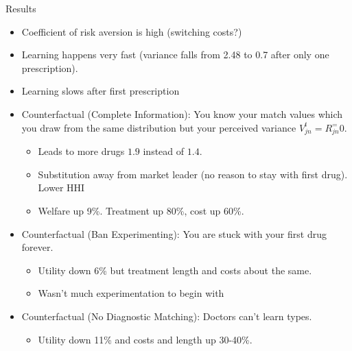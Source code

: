 \documentclass[xcolor=pdftex,dvipsnames,table,mathserif]{beamer}
\begin{document}
\begin{frame}{Results}
\begin{itemize}
\item Coefficient of risk aversion is high (switching costs?)
\item Learning happens very fast (variance falls from 2.48 to 0.7 after only \alert{one prescription}).
\item Learning slows after first prescription
\item Counterfactual (Complete Information): You know your match values which you draw from the same distribution but your perceived variance $V_{jn}^t = R_{jn}^=0$.
\begin{itemize}
\item Leads to more drugs $1.9$ instead of $1.4$.
\item Substitution away from market leader (no reason to stay with first drug). Lower HHI
\item Welfare up 9\%. Treatment up 80\%, cost up 60\%.
\end{itemize}
\item Counterfactual (Ban Experimenting): You are stuck with your first drug forever.
\begin{itemize}
\item Utility down 6\% but treatment length and costs about the same.
\item Wasn't much experimentation to begin with
\end{itemize}
\item Counterfactual (No Diagnostic Matching): Doctors can't learn types.
\begin{itemize}
\item Utility down 11\% and costs and length up 30-40\%.
\end{itemize}
\end{itemize}
\end{frame}
\end{document}
